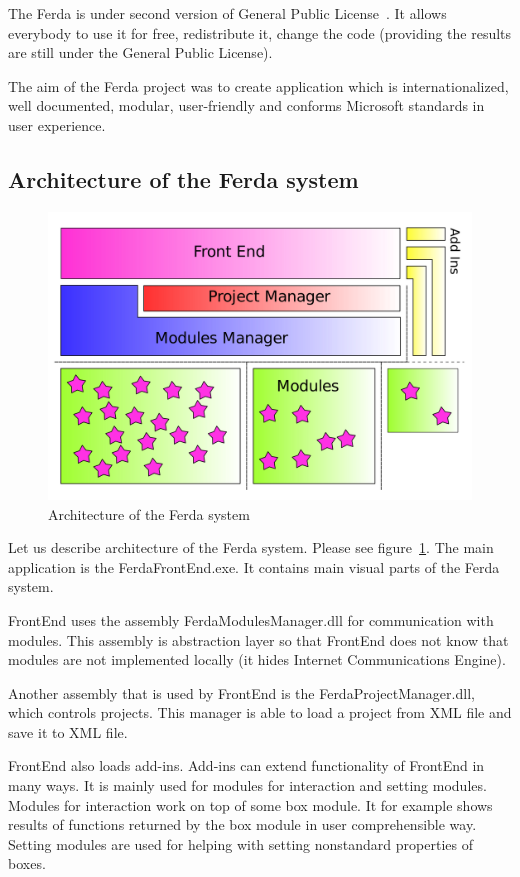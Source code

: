 \documentclass[a4paper,12pt]{book}
\begin{document}
The Ferda is under second version of General Public License~\cite{GPL2}. It allows everybody to use it for free, redistribute it, change the code (providing the results are still under the General Public License).

The aim of the Ferda project was to create application which is internationalized, well documented, modular, user-friendly and conforms Microsoft standards in user experience.

\subsection{Architecture of the Ferda system}
\begin{figure}
	\noindent\includegraphics[width=1\textwidth]{designB}
	\caption{Architecture of the Ferda system}
	\label{fig:architectureFerda}
\end{figure}

Let us describe architecture of the Ferda system. Please see figure~\ref{fig:architectureFerda}. The main application is the FerdaFrontEnd.exe. It contains main visual parts of the Ferda system.

FrontEnd uses the assembly FerdaModulesManager.dll for communication with modules. This assembly is abstraction layer so that FrontEnd does not know that modules are not implemented locally (it hides Internet Communications Engine).

Another assembly that is used by FrontEnd is the FerdaProjectManager.dll, which controls projects.  This manager is able to load a project from XML file and save it to XML file.

FrontEnd also loads add-ins. Add-ins can extend functionality of FrontEnd in many ways. It is mainly used for modules for interaction and setting modules. Modules for interaction work on top of some box module. It for example shows results of functions returned by the box module in user comprehensible way. Setting modules are used for helping with setting nonstandard properties of boxes.
\end{document}
